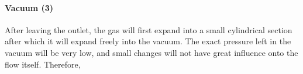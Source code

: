 \paragraph{Vacuum (3)}

	After leaving the outlet, the gas will first expand into a small cylindrical section after which it will expand freely into the vacuum.
	The exact pressure left in the vacuum will be very low, and small changes will not have great influence onto the flow itself.
	Therefore,

\newpage

